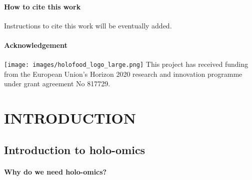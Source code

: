 \documentclass[
]{book}
\begin{document}
\hypertarget{how-to-cite-this-work}{%
\subsection*{How to cite this work}\label{how-to-cite-this-work}}

Instructions to cite this work will be eventually added.

\hypertarget{acknowledgement}{%
\subsection*{Acknowledgement}\label{acknowledgement}}

\texttt{[image: images/holofood\_logo\_large.png]}
This project has received funding from the European Union's Horizon 2020 research and innovation programme under grant agreement No 817729.

\hypertarget{part-introduction}{%
\part{INTRODUCTION}\label{part-introduction}}

\hypertarget{holo-omics}{%
\chapter{Introduction to holo-omics}\label{holo-omics}}

\hypertarget{why-holo-omics}{%
\subsection*{Why do we need holo-omics?}\label{why-holo-omics}}
\end{document}
